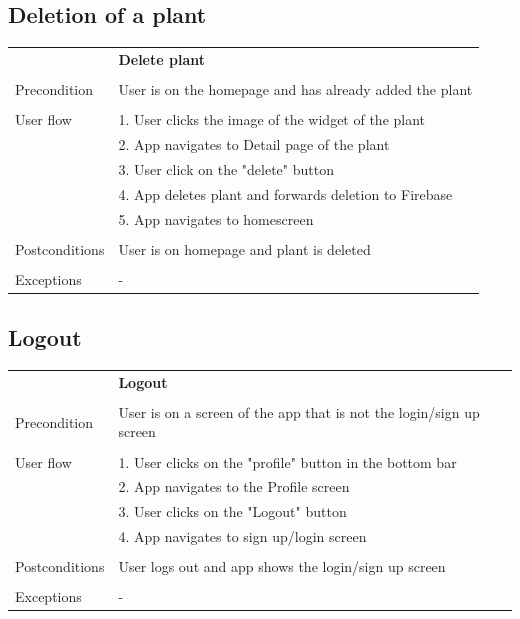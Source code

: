 \documentclass[10pt]{article}
\begin{document}
    \subsection{Deletion of a plant}
    \begin{tabular}{ p{3cm}|p{8cm} }
     & \textbf{Delete plant} \\
     \\
     Precondition & User is on the homepage and has already added the plant \\ 
     \\
     User flow 
     & 1. User clicks the image of the widget of the plant \\
     & 2. App navigates to Detail page of the plant \\
     & 3. User click on the "delete" button \\
     & 4. App deletes plant and forwards deletion to Firebase \\
     & 5. App navigates to homescreen \\
     \\
     Postconditions & User is on homepage and plant is deleted \\
     \\
     Exceptions & -\\
    \end{tabular}
    \newline
    \newline
    \newline
    \subsection{Logout}
    \begin{tabular}{ p{3cm}|p{8cm} }
     & \textbf{Logout} \\
     \\
     Precondition & User is on a screen of the app that is not the login/sign up screen \\ 
     \\
     User flow 
     & 1. User clicks on the "profile" button in the bottom bar  \\
     & 2. App navigates to the Profile screen \\ 
     & 3. User clicks on the "Logout" button \\ 
     & 4. App navigates to sign up/login screen \\
     \\
     Postconditions & User logs out and app shows the login/sign up screen \\
     \\
     Exceptions & -\\
    \end{tabular}
    
\end{document}
